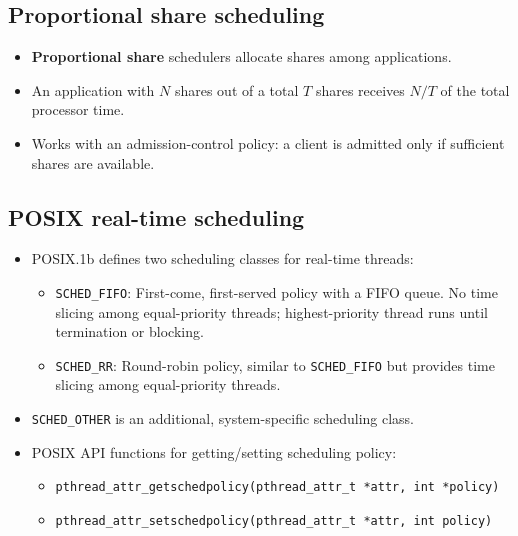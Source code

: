 \subsection{Proportional share scheduling}
\begin{itemize}
    \item \textbf{Proportional share} schedulers allocate shares among applications.
    \item An application with $N$ shares out of a total $T$ shares receives $N/T$ of the total processor time.
    \item Works with an admission-control policy: a client is admitted only if sufficient shares are available.
\end{itemize}

\subsection{POSIX real-time scheduling}
\begin{itemize}
    \item POSIX.1b defines two scheduling classes for real-time threads:
        \begin{itemize}
            \item \texttt{SCHED\_FIFO}: First-come, first-served policy with a FIFO queue. No time slicing among equal-priority threads; highest-priority thread runs until termination or blocking.
            \item \texttt{SCHED\_RR}: Round-robin policy, similar to \texttt{SCHED\_FIFO} but provides time slicing among equal-priority threads.
        \end{itemize}
    \item \texttt{SCHED\_OTHER} is an additional, system-specific scheduling class.
    \item POSIX API functions for getting/setting scheduling policy:
        \begin{itemize}
            \item \texttt{pthread\_attr\_getschedpolicy(pthread\_attr\_t *attr, int *policy)}
            \item \texttt{pthread\_attr\_setschedpolicy(pthread\_attr\_t *attr, int policy)}
        \end{itemize}
\end{itemize}


